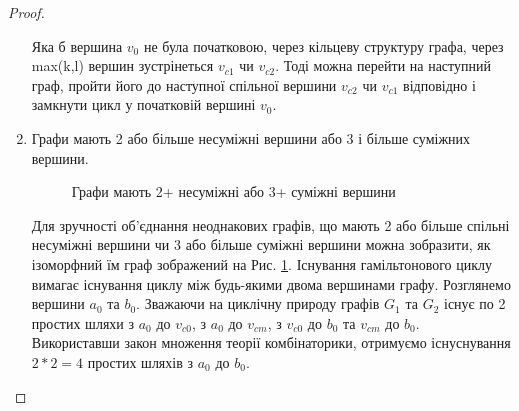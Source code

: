 \documentclass[a4paper,14pt,ukrainian]{extarticle}
\begin{document}
\begin{proof}
\begin{enumerate}
\begin{figure}[h]
                \end{figure}
                Яка б вершина $v_0$ не була початковою, через кільцеву структуру графа, через max(k,l) вершин зустрінеться $v_{c1}$ чи $v_{c2}$.
                Тоді можна перейти на наступний граф, пройти його до наступної спільної вершини $v_{c2}$ чи $v_{c1}$ відповідно і замкнути цикл у початковій вершині $v_0$.
            \item Графи мають 2 або більше несуміжні вершини або 3 і більше суміжних вершини.
                \begin{figure}[h]
                    \label{jg2+na3+a}
                    \caption{Графи мають 2+ несуміжні або 3+ суміжні вершини}
                    \centering
                \end{figure}
                Для зручності об’єднання неоднакових графів, що мають 2 або більше спільні несуміжні вершини чи 3 або більше суміжні вершини можна зобразити, як ізоморфний їм граф зображений на Рис. \ref{jg2+na3+a}.
                Існування гамільтонового циклу вимагає існування циклу між будь-якими двома вершинами графу.
                Розглянемо вершини $a_0$ та $b_0$.
                Зважаючи на циклічну природу графів $G_1$ та $G_2$ існує по 2 простих шляхи з $a_0$ до $v_{c0}$, з $a_0$ до $v_{cm}$, з $v_{c0}$ до $b_0$ та $v_{cm}$ до $b_0$.
                Використавши закон множення теорії комбінаторики, отримуємо існуснування $2*2=4$ простих шляхів з $a_0$ до $b_0$.

\end{enumerate}
\end{proof}
\end{document}
